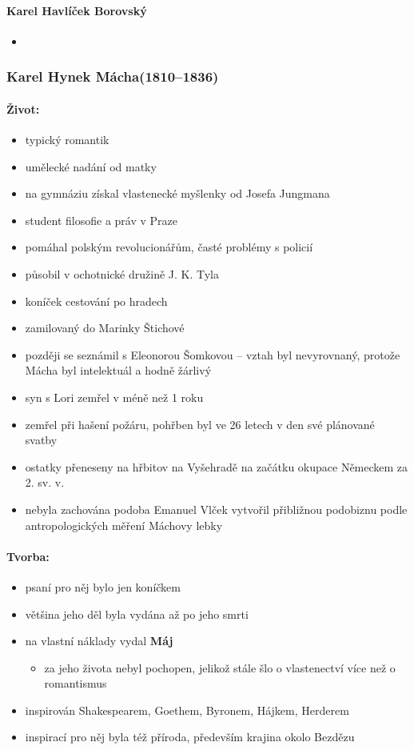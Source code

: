 \paragraph{Karel Havlíček Borovský}
\begin{itemize}
\item 
\end{itemize}

\subsubsection{Karel Hynek Mácha(1810--1836)}
\paragraph{Život:}
\begin{itemize}
\item typický romantik
\item umělecké nadání od matky
\item na gymnáziu získal vlastenecké myšlenky od Josefa Jungmana
\item student filosofie a práv v Praze
\item pomáhal polským revolucionářům, časté problémy s policií
\item působil v ochotnické družině J. K. Tyla
\item koníček cestování po hradech
\item zamilovaný do Marinky Štichové
\item později se seznámil s Eleonorou Šomkovou -- vztah byl nevyrovnaný, protože Mácha byl intelektuál a hodně žárlivý
\item syn s Lori zemřel v méně než 1 roku
\item zemřel při hašení požáru, pohřben byl ve 26 letech v den své plánované svatby
\item ostatky přeneseny na hřbitov na Vyšehradě na začátku okupace Německem za 2. sv. v.
\item nebyla zachována podoba \ra Emanuel Vlček vytvořil přibližnou podobiznu podle antropologických měření Máchovy lebky
\end{itemize}
\paragraph{Tvorba:}
\begin{itemize}
\item psaní pro něj bylo jen koníčkem
\item většina jeho děl byla vydána až po jeho smrti
\item na vlastní náklady vydal \textbf{Máj}
	\begin{itemize}
	\item za jeho života nebyl pochopen, jelikož stále šlo o vlastenectví více než o romantismus
	\end{itemize}
\item inspirován Shakespearem, Goethem, Byronem, Hájkem, Herderem
\item inspirací pro něj byla též příroda, především krajina okolo Bezdězu
\end{itemize}
